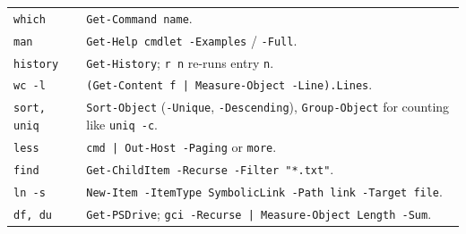 \begin{tabularx}{\linewidth}{lX}
    \texttt{which} & \texttt{Get-Command name}.\\
    \texttt{man} & \texttt{Get-Help cmdlet -Examples} / \texttt{-Full}.\\
    \texttt{history} & \texttt{Get-History}; \texttt{r n} re-runs entry \texttt{n}.\\
    \texttt{wc -l} & \texttt{(Get-Content f | Measure-Object -Line).Lines}.\\
    \texttt{sort, uniq} & \texttt{Sort-Object} (\texttt{-Unique}, \texttt{-Descending}), \texttt{Group-Object} for counting like \texttt{uniq -c}.\\
    \texttt{less} & \texttt{cmd | Out-Host -Paging} or \texttt{more}.\\
    \texttt{find} & \texttt{Get-ChildItem -Recurse -Filter "*.txt"}.\\
    \texttt{ln -s} & \texttt{New-Item -ItemType SymbolicLink -Path link -Target file}.\\
    \texttt{df, du} & \texttt{Get-PSDrive}; \texttt{gci -Recurse | Measure-Object Length -Sum}.\\
    \hline
\end{tabularx}
